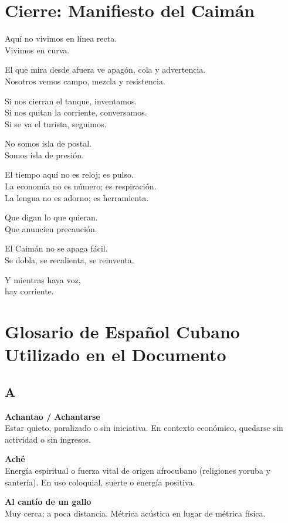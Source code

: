 \documentclass[12pt]{article}
\begin{document}
\section*{Cierre: Manifiesto del Caimán}

Aquí no vivimos en línea recta.\\
Vivimos en curva.

El que mira desde afuera ve apagón, cola y advertencia.\\
Nosotros vemos campo, mezcla y resistencia.

Si nos cierran el tanque, inventamos.\\
Si nos quitan la corriente, conversamos.\\
Si se va el turista, seguimos.

No somos isla de postal.\\
Somos isla de presión.

El tiempo aquí no es reloj; es pulso.\\
La economía no es número; es respiración.\\
La lengua no es adorno; es herramienta.

Que digan lo que quieran.\\
Que anuncien precaución.

El Caimán no se apaga fácil.\\
Se dobla, se recalienta, se reinventa.

Y mientras haya voz,\\
hay corriente.

\newpage
\appendix
\section{Glosario de Español Cubano Utilizado en el Documento}

\subsection*{A}

\textbf{Achantao / Achantarse}\\
Estar quieto, paralizado o sin iniciativa. En contexto económico, quedarse sin actividad o sin ingresos.

\textbf{Aché}\\
Energía espiritual o fuerza vital de origen afrocubano (religiones yoruba y santería). En uso coloquial, suerte o energía positiva.

\textbf{Al cantío de un gallo}\\
Muy cerca; a poca distancia. Métrica acústica en lugar de métrica física.
\end{document}
